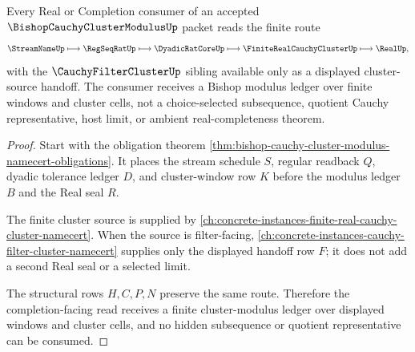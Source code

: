 \begin{theorem}
\label{thm:bishop-cauchy-cluster-modulus-completion-handoff}
Every Real or Completion consumer of an accepted $\BishopCauchyClusterModulusUp$ packet reads the finite route
$$
\StreamNameUp \longmapsto \RegSeqRatUp \longmapsto \DyadicRatCoreUp \longmapsto \FiniteRealCauchyClusterUp \longmapsto \RealUp,
$$
with the $\CauchyFilterClusterUp$ sibling available only as a displayed cluster-source handoff. The consumer receives a Bishop modulus ledger over finite windows and cluster cells, not a choice-selected subsequence, quotient Cauchy representative, host limit, or ambient real-completeness theorem.
\end{theorem}
\begin{proof}
Start with the obligation theorem \autoref{thm:bishop-cauchy-cluster-modulus-namecert-obligations}. It places the stream schedule $S$, regular readback $Q$, dyadic tolerance ledger $D$, and cluster-window row $K$ before the modulus ledger $B$ and the Real seal $R$.

The finite cluster source is supplied by \autoref{ch:concrete-instances-finite-real-cauchy-cluster-namecert}. When the source is filter-facing, \autoref{ch:concrete-instances-cauchy-filter-cluster-namecert} supplies only the displayed handoff row $F$; it does not add a second Real seal or a selected limit.

The structural rows $H,C,P,N$ preserve the same route. Therefore the completion-facing read receives a finite cluster-modulus ledger over displayed windows and cluster cells, and no hidden subsequence or quotient representative can be consumed.
\end{proof}




